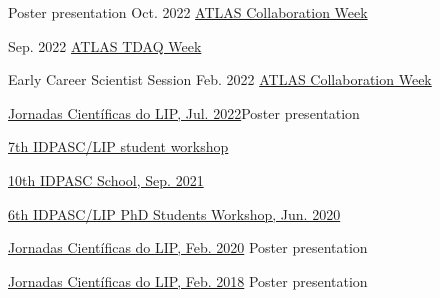 \begin{cventries}
    {Poster presentation}
    {Oct. 2022}
    {\href{https://indico.cern.ch/event/1187086/\#37-the-atlas-jet-trigger-in-ru}{ATLAS Collaboration Week}}
    {}\vspace*{2mm}

    {}
    {Sep. 2022}
    {\href{https://indico.cern.ch/event/1172448/contributions/4924082/}{ATLAS TDAQ Week}}
    {}\vspace*{2mm}

    {Early Career Scientist Session}
    {Feb. 2022}
    {\href{https://indico.cern.ch/event/1108354/\#167-readiness-of-the-jet-trigg}{ATLAS Collaboration Week}}{}


    {\href{https://indico.lip.pt/event/1183/}{Jornadas Científicas do LIP, Jul. 2022}}{Poster presentation}

    {\href{https://indico.lip.pt/event/1245/}{7th IDPASC/LIP student workshop}}{}
    
    
    {}{\href{https://indico.lip.pt/event/643}{10th IDPASC School, Sep. 2021}}{}

    {}{\href{https://indico.lip.pt/event/699/}{6th IDPASC/LIP PhD Students Workshop, Jun. 2020}}
    {}

    {}{\href{https://indico.lip.pt/event/650/}{Jornadas Científicas do LIP, Feb. 2020}}
    {Poster presentation}

    {}{\href{https://indico.lip.pt/event/359/}{Jornadas Científicas do LIP, Feb. 2018}}
    {Poster presentation}    

\end{cventries}